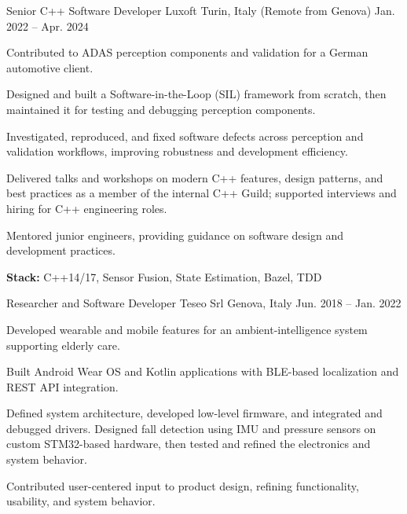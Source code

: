 \begin{cventries}
  \cventry
  {Senior C++ Software Developer}
  {Luxoft}
  {Turin, Italy (Remote from Genova)}
  {Jan. 2022 -- Apr. 2024}
  {
    \begin{cvitems}
    \item {Contributed to ADAS perception components and validation for a German automotive client.}
    \item {Designed and built a Software-in-the-Loop (SIL) framework from scratch, then maintained it for testing and debugging perception components.}
    \item {Investigated, reproduced, and fixed software defects across perception and validation workflows, improving robustness and development efficiency.}
    \item {Delivered talks and workshops on modern C++ features, design patterns, and best practices as a member of the internal C++ Guild; supported interviews and hiring for C++ engineering roles.}
    \item {Mentored junior engineers, providing guidance on software design and development practices.}
    \item {\textbf{Stack:} C++14/17, Sensor Fusion, State Estimation, Bazel, TDD}
    \end{cvitems}
  }


  \cventry
  {Researcher and Software Developer}
  {Teseo Srl}
  {Genova, Italy}
  {Jun. 2018 -- Jan. 2022}
  {
    \begin{cvitems}
    \item {Developed wearable and mobile features for an ambient-intelligence system supporting elderly care.}
    \item {Built Android Wear OS and Kotlin applications with BLE-based localization and REST API integration.}
    \item {Defined system architecture, developed low-level firmware, and integrated and debugged drivers. Designed fall detection using IMU and pressure sensors on custom STM32-based hardware, then tested and refined the electronics and system behavior.}
    \item {Contributed user-centered input to product design, refining functionality, usability, and system behavior.}
    \end{cvitems}
  }


\end{cventries}
